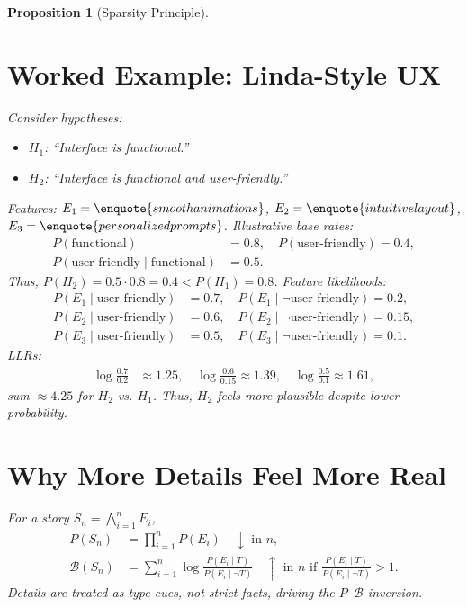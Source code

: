 \documentclass[openany]{book}
\newtheorem{proposition}{Proposition}[chapter]
\begin{document}
\begin{proposition}[Sparsity Principle]
\section{Worked Example: Linda-Style UX}
\label{sec:conj-example}
Consider hypotheses:
\begin{itemize}
  \item $H_1$: \enquote{Interface is functional.}
  \item $H_2$: \enquote{Interface is functional and user-friendly.}
\end{itemize}
Features: $E_1 = \enquote{smooth animations}$, $E_2 = \enquote{intuitive layout}$, $E_3 = \enquote{personalized prompts}$. Illustrative base rates:
\begin{align*}
P(\text{functional}) &= 0.8, \quad P(\text{user-friendly}) = 0.4, \\
P(\text{user-friendly} \mid \text{functional}) &= 0.5.
\end{align*}
Thus, $P(H_2) = 0.5 \cdot 0.8 = 0.4 < P(H_1) = 0.8$. Feature likelihoods:
\begin{align*}
P(E_1 \mid \text{user-friendly}) &= 0.7, \quad P(E_1 \mid \neg \text{user-friendly}) = 0.2, \\
P(E_2 \mid \text{user-friendly}) &= 0.6, \quad P(E_2 \mid \neg \text{user-friendly}) = 0.15, \\
P(E_3 \mid \text{user-friendly}) &= 0.5, \quad P(E_3 \mid \neg \text{user-friendly}) = 0.1.
\end{align*}
LLRs:
\begin{align*}
\log \frac{0.7}{0.2} &\approx 1.25, \quad \log \frac{0.6}{0.15} \approx 1.39, \quad \log \frac{0.5}{0.1} \approx 1.61,
\end{align*}
sum $\approx 4.25$ for $H_2$ vs. $H_1$. Thus, $H_2$ feels more plausible despite lower probability.

\section{Why More Details Feel More Real}
\label{sec:conj-why}
For a story $S_n = \bigwedge_{i=1}^n E_i$,
\begin{align*}
P(S_n) &= \prod_{i=1}^n P(E_i) \quad \downarrow \text{ in } n, \\
\mathcal{B}(S_n) &= \sum_{i=1}^n \log \frac{P(E_i \mid T)}{P(E_i \mid \neg T)} \quad \uparrow \text{ in } n \text{ if } \frac{P(E_i \mid T)}{P(E_i \mid \neg T)} > 1.
\end{align*}
Details are treated as type cues, not strict facts, driving the $P$--$\mathcal{B}$ inversion.


\end{proposition}
\end{document}
